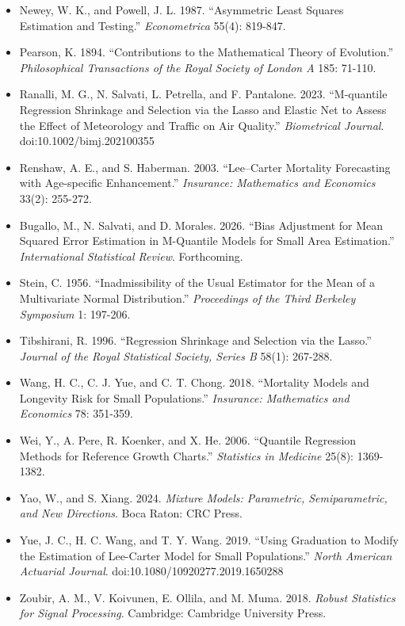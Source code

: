 \documentclass[UTF8, fontset=macnew, a4paper, 12pt]{ctexart}
\begin{document}
\begin{itemize}[leftmargin=2em, itemsep=2pt, parsep=0pt]
        \textit{Computational Statistics \& Data Analysis} 173: 107500.
  \item[] Newey, W. K., and Powell, J. L. 1987. ``Asymmetric Least Squares
        Estimation and Testing.'' \textit{Econometrica} 55(4): 819-847.
  \item[] Pearson, K. 1894. ``Contributions to the Mathematical Theory of
        Evolution.'' \textit{Philosophical Transactions of the Royal Society of
        London A} 185: 71-110.
  \item[] Ranalli, M. G., N. Salvati, L. Petrella, and F. Pantalone. 2023.
        ``M-quantile Regression Shrinkage and Selection via the Lasso and
        Elastic Net to Assess the Effect of Meteorology and Traffic on Air
        Quality.'' \textit{Biometrical Journal}. doi:10.1002/bimj.202100355
  \item[] Renshaw, A. E., and S. Haberman. 2003. ``Lee--Carter Mortality
        Forecasting with Age-specific Enhancement.''
        \textit{Insurance: Mathematics and Economics} 33(2): 255-272.
  \item[] Bugallo, M., N. Salvati, and D. Morales. 2026. ``Bias Adjustment for
        Mean Squared Error Estimation in M-Quantile Models for Small Area
        Estimation.'' \textit{International Statistical Review}. Forthcoming.
  \item[] Stein, C. 1956. ``Inadmissibility of the Usual Estimator for the Mean
        of a Multivariate Normal Distribution.'' \textit{Proceedings of the
        Third Berkeley Symposium} 1: 197-206.
  \item[] Tibshirani, R. 1996. ``Regression Shrinkage and Selection via the
        Lasso.'' \textit{Journal of the Royal Statistical Society, Series B}
        58(1): 267-288.
  \item[] Wang, H. C., C. J. Yue, and C. T. Chong. 2018. ``Mortality Models and
        Longevity Risk for Small Populations.''
        \textit{Insurance: Mathematics and Economics} 78: 351-359.
  \item[] Wei, Y., A. Pere, R. Koenker, and X. He. 2006. ``Quantile Regression
        Methods for Reference Growth Charts.'' \textit{Statistics in Medicine}
        25(8): 1369-1382.
  \item[] Yao, W., and S. Xiang. 2024. \textit{Mixture Models: Parametric,
        Semiparametric, and New Directions}. Boca Raton: CRC Press.
  \item[] Yue, J. C., H. C. Wang, and T. Y. Wang. 2019. ``Using Graduation to
        Modify the Estimation of Lee-Carter Model for Small Populations.''
        \textit{North American Actuarial Journal}.
        doi:10.1080/10920277.2019.1650288
  \item[] Zoubir, A. M., V. Koivunen, E. Ollila, and M. Muma. 2018.
        \textit{Robust Statistics for Signal Processing}. Cambridge: Cambridge
        University Press.
\end{itemize}
\end{document}
